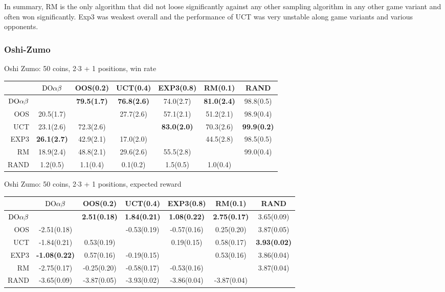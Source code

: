 In summary, RM is the only algorithm that did not loose significantly against any other sampling algorithm in any other game variant and often won significantly. Exp3 was weakest overall and the performance of UCT was very unstable along game variants and various opponents.


\subsubsection{Oshi-Zumo}

\begin{table}[t!]
\centering
\begin{scriptsize}

Oshi Zumo: 50 coins, 2$\cdot$3 + 1 positions, win rate
\begin{tabular}{|r|cccccc|}\hline
&$\textrm{DO}\alpha\beta$&OOS(0.2)&UCT(0.4)&EXP3(0.8)&RM(0.1)&RAND\\\hline
$\textrm{DO}\alpha\beta$&&\textbf{79.5(1.7)}&\textbf{76.8(2.6)}&74.0(2.7)&\textbf{81.0(2.4)}&98.8(0.5)\\
OOS&20.5(1.7)&&27.7(2.6)&57.1(2.1)&51.2(2.1)&98.9(0.4)\\
UCT&23.1(2.6)&72.3(2.6)&&\textbf{83.0(2.0)}&70.3(2.6)&\textbf{99.9(0.2)}\\
EXP3&\textbf{26.1(2.7)}&42.9(2.1)&17.0(2.0)&&44.5(2.8)&98.5(0.5)\\
RM&18.9(2.4)&48.8(2.1)&29.6(2.6)&55.5(2.8)&&99.0(0.4)\\
RAND&1.2(0.5)&1.1(0.4)&0.1(0.2)&1.5(0.5)&1.0(0.4)&\\
\hline
\end{tabular}

Oshi Zumo: 50 coins, 2$\cdot$3 + 1 positions, expected reward
\begin{tabular}{|r|cccccc|}\hline
&$\textrm{DO}\alpha\beta$&OOS(0.2)&UCT(0.4)&EXP3(0.8)&RM(0.1)&RAND\\\hline
$\textrm{DO}\alpha\beta$&&\textbf{2.51(0.18)}&\textbf{1.84(0.21)}&\textbf{1.08(0.22)}&\textbf{2.75(0.17)}&3.65(0.09)\\
OOS&-2.51(0.18)&&-0.53(0.19)&-0.57(0.16)&0.25(0.20)&3.87(0.05)\\
UCT&-1.84(0.21)&0.53(0.19)&&0.19(0.15)&0.58(0.17)&\textbf{3.93(0.02)}\\
EXP3&\textbf{-1.08(0.22)}&0.57(0.16)&-0.19(0.15)&&0.53(0.16)&3.86(0.04)\\
RM&-2.75(0.17)&-0.25(0.20)&-0.58(0.17)&-0.53(0.16)&&3.87(0.04)\\
RAND&-3.65(0.09)&-3.87(0.05)&-3.93(0.02)&-3.86(0.04)&-3.87(0.04)&\\
\hline
\end{tabular}


\end{scriptsize}
\end{table}
